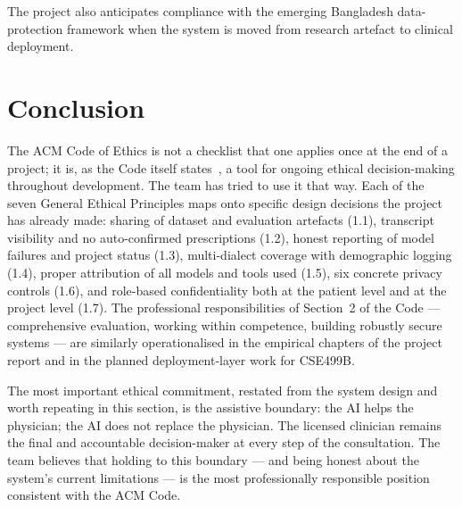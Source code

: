 \documentclass[12pt,a4paper]{article}
\begin{document}
The project also anticipates compliance with the emerging Bangladesh
data-protection framework when the system is moved from research
artefact to clinical deployment.

\section{Conclusion}

The ACM Code of Ethics is not a checklist that one applies once at
the end of a project; it is, as the Code itself
states~\cite{eth:acm2018}, a tool for ongoing ethical
decision-making throughout development. The team has tried to use
it that way. Each of the seven General Ethical Principles maps onto
specific design decisions the project has already made:
sharing of dataset and evaluation artefacts (1.1), transcript
visibility and no auto-confirmed prescriptions (1.2), honest
reporting of model failures and project status (1.3), multi-dialect
coverage with demographic logging (1.4), proper attribution of all
models and tools used (1.5), six concrete privacy controls (1.6),
and role-based confidentiality both at the patient level and at the
project level (1.7). The professional responsibilities of Section~2
of the Code ---  comprehensive evaluation, working within
competence, building robustly secure systems --- are similarly
operationalised in the empirical chapters of the project report and
in the planned deployment-layer work for CSE499B.

The most important ethical commitment, restated from the system
design and worth repeating in this section, is the assistive
boundary: the AI helps the physician; the AI does not replace the
physician. The licensed clinician remains the final and
accountable decision-maker at every step of the consultation. The
team believes that holding to this boundary --- and being honest
about the system's current limitations --- is the most
professionally responsible position consistent with the ACM Code.
\end{document}
